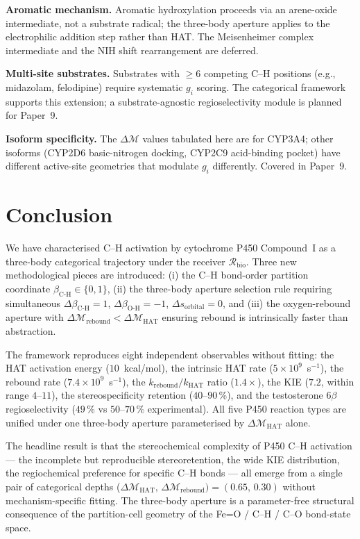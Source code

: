 \documentclass[11pt,twocolumn,a4paper]{article}
\theoremstyle{definition}
\theoremstyle{remark}
\newcommand{\Recv}{\mathcal{R}}
\newcommand{\depth}{\mathcal{M}}
\newcommand{\betaCH}{\beta_{\mathrm{C\text{-}H}}}
\newcommand{\betaOH}{\beta_{\mathrm{O\text{-}H}}}
\newcommand{\kHAT}{k_{\mathrm{HAT}}}
\newcommand{\krebound}{k_{\mathrm{rebound}}}
\begin{document}
\textbf{Aromatic mechanism.} Aromatic hydroxylation proceeds via an
arene-oxide intermediate, not a substrate radical; the three-body aperture
applies to the electrophilic addition step rather than HAT. The Meisenheimer
complex intermediate and the NIH shift rearrangement are deferred.

\textbf{Multi-site substrates.} Substrates with $\geq 6$ competing C--H
positions (e.g., midazolam, felodipine) require systematic $g_i$ scoring.
The categorical framework supports this extension; a substrate-agnostic
regioselectivity module is planned for Paper~9.

\textbf{Isoform specificity.} The $\Delta\depth$ values tabulated here
are for CYP3A4; other isoforms (CYP2D6 basic-nitrogen docking, CYP2C9
acid-binding pocket) have different active-site geometries that modulate
$g_i$ differently. Covered in Paper~9.

\section{Conclusion}
\label{sec:conclusion}

We have characterised C--H activation by cytochrome P450 Compound~I as a
three-body categorical trajectory under the receiver $\Recv_{\mathrm{bio}}$.
Three new methodological pieces are introduced: (i) the C--H bond-order
partition coordinate $\betaCH \in \{0,1\}$, (ii) the three-body aperture
selection rule requiring simultaneous $\Delta\betaCH = 1$, $\Delta\betaOH = -1$,
$\Delta s_{\mathrm{orbital}} = 0$, and (iii) the oxygen-rebound aperture with
$\Delta\depth_{\mathrm{rebound}} < \Delta\depth_{\mathrm{HAT}}$ ensuring
rebound is intrinsically faster than abstraction.

The framework reproduces eight independent observables without fitting: the
HAT activation energy ($10$~kcal/mol), the intrinsic HAT rate ($5 \times
10^9$~s$^{-1}$), the rebound rate ($7.4 \times 10^9$~s$^{-1}$), the
$\krebound/\kHAT$ ratio ($1.4\times$), the KIE ($7.2$, within range $4$--$11$),
the stereospecificity retention ($40$--$90\,\%$), and the testosterone $6\beta$
regioselectivity ($49\,\%$ vs $50$--$70\,\%$ experimental). All five P450
reaction types are unified under one three-body aperture parameterised
by $\Delta\depth_{\mathrm{HAT}}$ alone.

The headline result is that the stereochemical complexity of P450 C--H
activation --- the incomplete but reproducible stereoretention, the wide
KIE distribution, the regiochemical preference for specific C--H bonds ---
all emerge from a single pair of categorical depths
($\Delta\depth_{\mathrm{HAT}},\, \Delta\depth_{\mathrm{rebound}}) = (0.65,\, 0.30)$
without mechanism-specific fitting. The three-body aperture is a
parameter-free structural consequence of the partition-cell geometry of
the Fe=O / C--H / C--O bond-state space.



\end{document}
